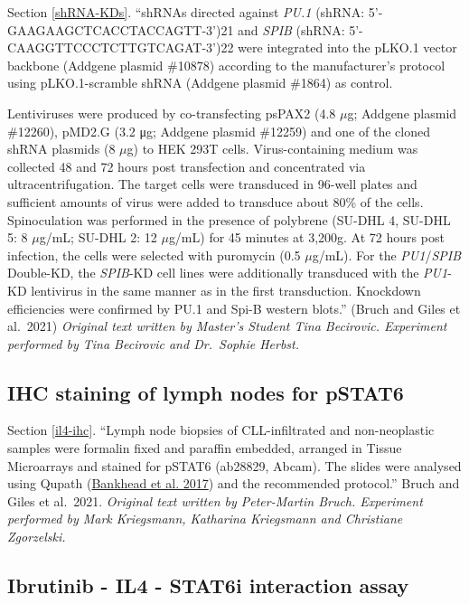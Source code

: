 \documentclass[11pt, a4paper, twosided]{book}
\begin{document}
Section \ref{shRNA-KDs}. ``shRNAs directed against \emph{PU.1} (shRNA: 5'-GAAGAAGCTCACCTACCAGTT-3')21 and \emph{SPIB} (shRNA: 5'-CAAGGTTCCCTCTTGTCAGAT-3')22 were integrated into the pLKO.1 vector backbone (Addgene plasmid \#10878) according to the manufacturer's protocol using pLKO.1-scramble shRNA (Addgene plasmid \#1864) as control.

Lentiviruses were produced by co-transfecting psPAX2 (4.8 \(\mu\)g; Addgene plasmid \#12260), pMD2.G (3.2 μg; Addgene plasmid \#12259) and one of the cloned shRNA plasmids (8 \(\mu\)g) to HEK 293T cells. Virus-containing medium was collected 48 and 72 hours post transfection and concentrated via ultracentrifugation. The target cells were transduced in 96-well plates and sufficient amounts of virus were added to transduce about 80\% of the cells. Spinoculation was performed in the presence of polybrene (SU-DHL 4, SU-DHL 5: 8 \(\mu\)g/mL; SU-DHL 2: 12 \(\mu\)g/mL) for 45 minutes at 3,200g. At 72 hours post infection, the cells were selected with puromycin (0.5 \(\mu\)g/mL). For the \emph{PU1}/\emph{SPIB} Double-KD, the \emph{SPIB}-KD cell lines were additionally transduced with the \emph{PU1}-KD lentivirus in the same manner as in the first transduction. Knockdown efficiencies were confirmed by PU.1 and Spi-B western blots.'' (Bruch and Giles et al.~2021) \emph{Original text written by Master's Student Tina Becirovic. Experiment performed by Tina Becirovic and Dr.~Sophie Herbst.}

\hypertarget{il4-ihc-exp}{%
\subsection{IHC staining of lymph nodes for pSTAT6}\label{il4-ihc-exp}}

Section \ref{il4-ihc}. ``Lymph node biopsies of CLL-infiltrated and non-neoplastic samples were formalin fixed and paraffin embedded, arranged in Tissue Microarrays and stained for pSTAT6 (ab28829, Abcam). The slides were analysed using Qupath (\protect\hyperlink{ref-Bankhead2017}{Bankhead et al. 2017}) and the recommended protocol.'' Bruch and Giles et al.~2021. \emph{Original text written by Peter-Martin Bruch. Experiment performed by Mark Kriegsmann, Katharina Kriegsmann and Christiane Zgorzelski.}

\hypertarget{ibrutinib---il4---stat6i-interaction-assay}{%
\subsection{Ibrutinib - IL4 - STAT6i interaction assay}\label{ibrutinib---il4---stat6i-interaction-assay}}
\end{document}
